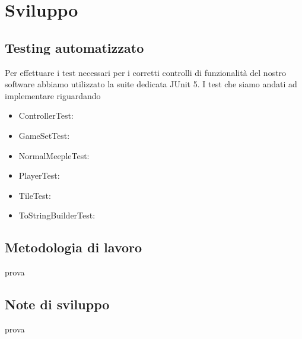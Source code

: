 \section{Sviluppo}
\subsection{Testing automatizzato}
Per effettuare i test necessari per i corretti controlli di funzionalità del nostro software abbiamo utilizzato la suite dedicata JUnit 5. I test che siamo andati ad implementare riguardando
\begin{itemize}
    \item ControllerTest: 
    \item GameSetTest:
    \item NormalMeepleTest: 
    \item PlayerTest:
    \item TileTest:
    \item ToStringBuilderTest: 
\end{itemize}

\subsection{Metodologia di lavoro}
prova
\subsection{Note di sviluppo}
prova